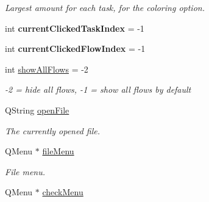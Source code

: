 \begin{DoxyCompactItemize}
\begin{DoxyCompactList}\small\item\em Largest amount for each task, for the coloring option. \end{DoxyCompactList}\item 
\hypertarget{class_main_window_a218b4cd8253b62c52f813a38ac6896ab}{}int {\bfseries current\+Clicked\+Task\+Index} = -\/1\label{class_main_window_a218b4cd8253b62c52f813a38ac6896ab}

\item 
\hypertarget{class_main_window_a651ff42acb84f96089f4a91aff00771a}{}int {\bfseries current\+Clicked\+Flow\+Index} = -\/1\label{class_main_window_a651ff42acb84f96089f4a91aff00771a}

\item 
\hypertarget{class_main_window_a716410ca805f3fd24ee3d00e5998dd51}{}int \hyperlink{class_main_window_a716410ca805f3fd24ee3d00e5998dd51}{show\+All\+Flows} = -\/2\label{class_main_window_a716410ca805f3fd24ee3d00e5998dd51}

\begin{DoxyCompactList}\small\item\em -\/2 = hide all flows, -\/1 = show all flows by default \end{DoxyCompactList}\item 
\hypertarget{class_main_window_a090ea7bbf9ff3fa21ba13e32f8c2d15d}{}Q\+String \hyperlink{class_main_window_a090ea7bbf9ff3fa21ba13e32f8c2d15d}{open\+File}\label{class_main_window_a090ea7bbf9ff3fa21ba13e32f8c2d15d}

\begin{DoxyCompactList}\small\item\em The currently opened file. \end{DoxyCompactList}\item 
\hypertarget{class_main_window_a426da48f6e2f865b07a28533c07c4f7a}{}Q\+Menu $\ast$ \hyperlink{class_main_window_a426da48f6e2f865b07a28533c07c4f7a}{file\+Menu}\label{class_main_window_a426da48f6e2f865b07a28533c07c4f7a}

\begin{DoxyCompactList}\small\item\em File menu. \end{DoxyCompactList}\item 
\hypertarget{class_main_window_a976ec486a97951607dd8acf14bbbe0a8}{}Q\+Menu $\ast$ \hyperlink{class_main_window_a976ec486a97951607dd8acf14bbbe0a8}{check\+Menu}\label{class_main_window_a976ec486a97951607dd8acf14bbbe0a8}


\end{DoxyCompactItemize}

